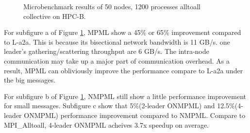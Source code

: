 \begin{figure}[!htb]
  \caption{Microbenchmark results of 50 nodes, 1200 processes alltoall collective on HPC-B.}
	\label{HPCD-EXPR}
	\vspace{0.1in}
\end{figure}
For subfigure a of Figure \ref{HPCD-EXPR}, MPML show a 45\% or 65\% improvement compared to L-a2a. This is because its bisectional network bandwidth is 11 GB/s. one leader's gathering/scattering throughput are 6 GB/s. The intra-node communication may take up a major part of communication overhead. As a result, MPML can obliviously improve the performance compare to L-a2a under the big messages.

For subfigure b of Figure \ref{HPCD-EXPR}, NMPML still show a little performance improvement for small messages.
Subfigure c show that 5\%(2-leader ONMPML) and 12.5\%(4-leader ONMPML) performance improvement compared to NMPML.
Compare to MPI\_Alltoall, 4-leader ONMPML acheives 3.7x speedup on average.


